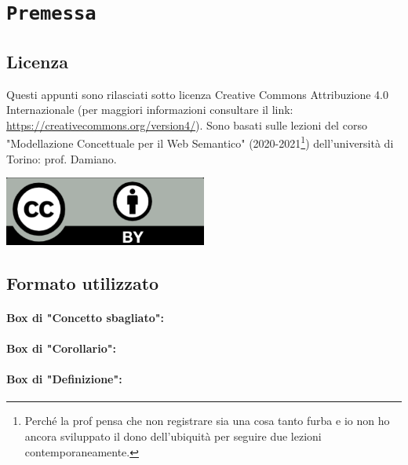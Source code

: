 \chapter*{\centering \texttt{Premessa}}

\section*{Licenza}

Questi appunti sono rilasciati sotto licenza Creative Commons Attribuzione 4.0 Internazionale (per maggiori
informazioni consultare il link: \href{https://creativecommons.org/version4/}{https://creativecommons.org/version4/}). Sono basati sulle lezioni del corso "Modellazione Concettuale per il Web Semantico" (2020-2021\footnote{Perché la prof pensa che non registrare sia una cosa tanto furba e io non ho ancora sviluppato il dono dell'ubiquità per seguire due lezioni contemporaneamente.}) dell'università di Torino: prof. Damiano.
\begin{center}
    \includegraphics[width=0.5\textwidth]{images/cc.png}
\end{center}

\section*{Formato utilizzato}

\subsubsection{Box di "Concetto sbagliato":}


\subsubsection{Box di "Corollario":}


\subsubsection{Box di "Definizione":}

